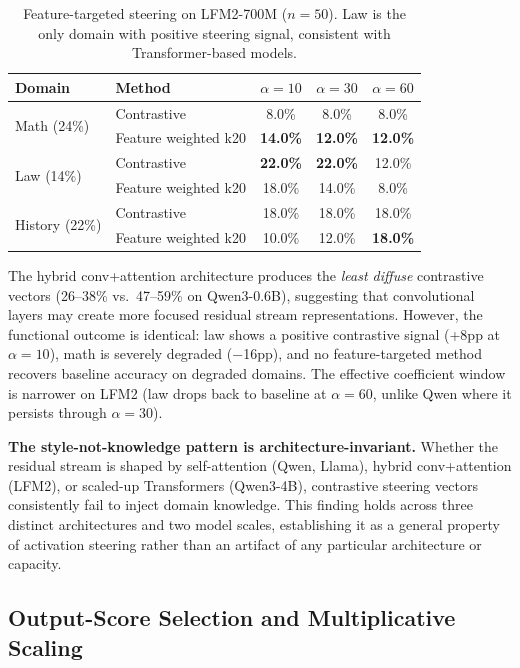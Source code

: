 \documentclass[11pt,a4paper]{article}
\begin{document}
\begin{table}[H]
\centering
\caption{Feature-targeted steering on LFM2-700M ($n=50$). Law is the only domain with positive steering signal, consistent with Transformer-based models.}
\label{tab:feature_targeted_lfm2}
\small
\begin{tabular}{llccc}
\toprule
\textbf{Domain} & \textbf{Method} & $\alpha=10$ & $\alpha=30$ & $\alpha=60$ \\
\midrule
\multirow{2}{*}{Math (24\%)}
  & Contrastive       & 8.0\% & 8.0\% & 8.0\% \\
  & Feature weighted k20    & \textbf{14.0\%} & \textbf{12.0\%} & \textbf{12.0\%} \\
\midrule
\multirow{2}{*}{Law (14\%)}
  & Contrastive       & \textbf{22.0\%} & \textbf{22.0\%} & 12.0\% \\
  & Feature weighted k20    & 18.0\% & 14.0\% & 8.0\% \\
\midrule
\multirow{2}{*}{History (22\%)}
  & Contrastive       & 18.0\% & 18.0\% & 18.0\% \\
  & Feature weighted k20    & 10.0\% & 12.0\% & \textbf{18.0\%} \\
\bottomrule
\end{tabular}
\end{table}

The hybrid conv+attention architecture produces the \textit{least diffuse} contrastive vectors (26--38\% vs.\ 47--59\% on Qwen3-0.6B), suggesting that convolutional layers may create more focused residual stream representations. However, the functional outcome is identical: law shows a positive contrastive signal (+8pp at $\alpha=10$), math is severely degraded ($-$16pp), and no feature-targeted method recovers baseline accuracy on degraded domains. The effective coefficient window is narrower on LFM2 (law drops back to baseline at $\alpha=60$, unlike Qwen where it persists through $\alpha=30$).

\textbf{The style-not-knowledge pattern is architecture-invariant.} Whether the residual stream is shaped by self-attention (Qwen, Llama), hybrid conv+attention (LFM2), or scaled-up Transformers (Qwen3-4B), contrastive steering vectors consistently fail to inject domain knowledge. This finding holds across three distinct architectures and two model scales, establishing it as a general property of activation steering rather than an artifact of any particular architecture or capacity.

\subsection{Output-Score Selection and Multiplicative Scaling}
\label{sec:output_score}
\end{document}
